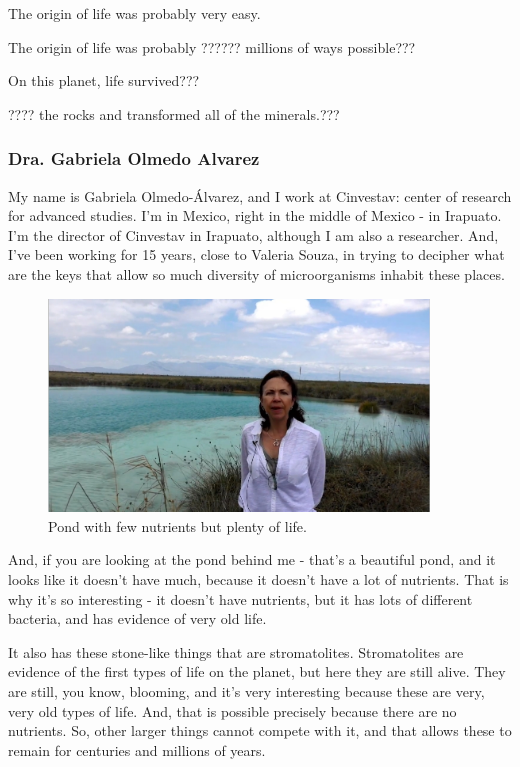 \documentclass[]{article}
\begin{document}
The origin of life was probably very easy.

The origin of life was probably ??????
millions of ways possible???

On this planet, life survived???

???? the rocks
and transformed all of the minerals.???
\subsubsection{Dra. Gabriela Olmedo Alvarez}
My name is Gabriela Olmedo-Álvarez, and I work at Cinvestav: center of research for advanced studies. I'm in Mexico, right in the middle of Mexico - in Irapuato. I'm the director of Cinvestav in Irapuato, although I am also a researcher. And, I've been working for 15 years, close to Valeria Souza, in trying to decipher what are the keys that allow so much diversity of microorganisms inhabit these places.

\begin{figure}[H]
	\caption{Pond with few nutrients but plenty of life.} 
	\includegraphics[width=0.9\textwidth]{CuatroCienegas4}
\end{figure}

And, if you are looking at the pond behind me - that's a beautiful pond, and it looks like it doesn't have much, because it doesn't have a lot of nutrients. That is why it's so interesting - it doesn't have nutrients, but it has lots of different bacteria, and has evidence of very old life.

It also has these stone-like things that are stromatolites. Stromatolites are evidence of the first types of life on the planet, but here they are still alive. They are still, you know, blooming, and it's very interesting because these are very, very old types of life. And, that is possible precisely because there are no nutrients. So, other larger things
cannot compete with it, and that allows these to remain for centuries and millions of years.
\end{document}
